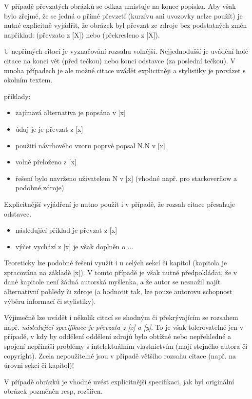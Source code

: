 \documentclass[male,czech,api_bc]{kitheses}
\begin{document}
V případě převzatých obrázků se odkaz umisťuje na konec popisku. Aby však bylo zřejmé, že se jedná o přímé převzetí (kurzívu ani uvozovky nelze použít) je nutné explicitně vyjádřit, že obrázek byl převzat ze zdroje bez podstatných změn například: (převzato z [X]) nebo (překresleno z [X]).

U nepřímých citací je vyznačování rozsahu volnější. Nejjednodušší je uvádění holé citace na konci vět (před tečkou) nebo konci odstavce (za poslední tečkou). V mnoha případech je ale možné citace
uvádět explicitněji a stylistiky je provázet s okolním textem.

příklady:

\begin{itemize}
\item zajímavá alternativa je popsána v [x]
\item údaj je je převzat z [x]
\item použití návrhového vzoru poprvé popsal N.N v [x]
\item volně přeloženo z [x]
\item řešení bylo navrženo uživatelem N v [x] (vhodné např. pro stackoverflow a podobné zdroje)
\end{itemize}

Explicitnější vyjádření je nutno použít i v případě, že rozsah citace přesahuje odstavec.

\begin{itemize}
\item následující příklad je převzat z [x]
\item výčet vychází z [x] je však doplněn o ...
\end{itemize}

Teoreticky lze podobné řešení využít i u celých sekcí či kapitol (kapitola je zpracována na základě [x]). V tomto případě je však nutné předpokládat, že v dané kapitole není žádná autorská myšlenka, a že autor se nesnažil najít alternativní pohledy či zdroje (a hodnotit tak, lze pouze autorovu schopnost výběru informací či stylistiky).

Výjimečně lze uvádět i několik citací se shodným či překrývajícím se rozsahem např. \textit{následující specifikace je převzata z [x] a [y]}. To je však tolerovatelné jen v případě, v kdy by oddělení oddělení zdrojů bylo obtížné nebo nepřehledné a spojení nepřináší problémy s intelektuálním vlastnictvím (mají stejného autora či copyright). Zcela nepoužitelné jsou v případě většího rozsahu citace (např. na úrovni sekcí či kapitol)!


V případě obrázků je vhodné uvést explicitnější specifikaci, jak byl originální obrázek pozměněn resp, rozšířen.
\end{document}
